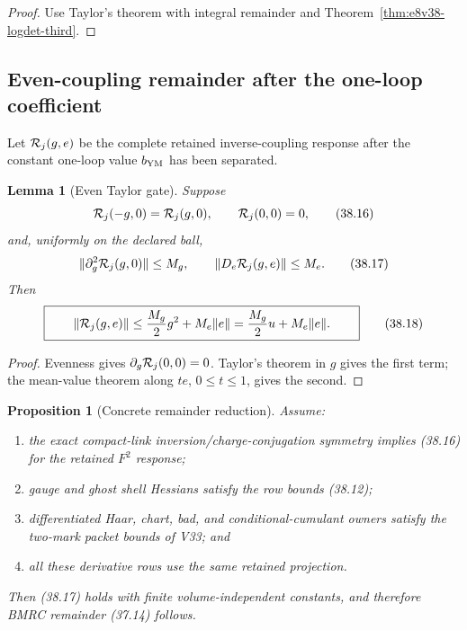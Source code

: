 \documentclass[11pt,oneside]{book}
\newtheorem{lemma}[theorem]{Lemma}
\newtheorem{proposition}[theorem]{Proposition}
\theoremstyle{definition}
\theoremstyle{remark}
\begin{document}
\begin{proof}
Use Taylor's theorem with integral remainder and
Theorem~\ref{thm:e8v38-logdet-third}.
\end{proof}

\subsection{Even-coupling remainder after the one-loop coefficient}

Let \({\cal R}_j(g,e)\) be the complete retained inverse-coupling
response after the constant one-loop value \(b_{\rm YM}\) has been
separated.

\begin{lemma}[Even Taylor gate]
\label{lem:e8v38-even-remainder}
Suppose
\[
 {\cal R}_j(-g,0)={\cal R}_j(g,0),\qquad
 {\cal R}_j(0,0)=0,                                              \tag{38.16}
\]
and, uniformly on the declared ball,
\[
 \|\partial_g^2{\cal R}_j(g,0)\|\leq M_g,\qquad
 \|D_e{\cal R}_j(g,e)\|\leq M_e.                                \tag{38.17}
\]
Then
\[
 \boxed{\qquad
 \|{\cal R}_j(g,e)\|
 \leq\frac{M_g}{2}g^2+M_e\|e\|
 =\frac{M_g}{2}u+M_e\|e\|.
\qquad}                                                         \tag{38.18}
\]
\end{lemma}

\begin{proof}
Evenness gives \(\partial_g{\cal R}_j(0,0)=0\).
Taylor's theorem in \(g\) gives the first term; the mean-value
theorem along \(te\), \(0\leq t\leq1\), gives the second.
\end{proof}

\begin{proposition}[Concrete remainder reduction]
\label{prop:e8v38-remainder-reduction}
Assume:
\begin{enumerate}
\item the exact compact-link inversion/charge-conjugation symmetry
      implies (38.16) for the retained \(F^2\) response;
\item gauge and ghost shell Hessians satisfy the row bounds (38.12);
\item differentiated Haar, chart, bad, and conditional-cumulant
      owners satisfy the two-mark packet bounds of V33; and
\item all these derivative rows use the same retained projection.
\end{enumerate}
Then (38.17) holds with finite volume-independent constants, and
therefore BMRC remainder (37.14) follows.
\end{proposition}
\end{document}
